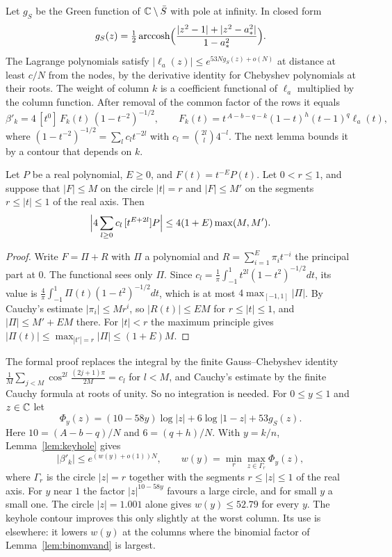 Let $g_S$ be the Green function of $\mathbb C\setminus\bar S$ with pole at infinity. In closed form
\[
 g_S(z)=\tfrac12\operatorname{arccosh}\Bigl(\frac{|z^2-1|+|z^2-a_*^2|}{1-a_*^2}\Bigr).
\]
The Lagrange polynomials satisfy $|\ell_a(z)|\le e^{53Ng_S(z)+o(N)}$ at distance at least $c/N$ from the
nodes, by the derivative identity for Chebyshev polynomials at their roots. The weight of column $k$ is a
coefficient functional of $\ell_a$ multiplied by the column function. After removal of the common factor of
the rows it equals
\[
 \beta'_k=4\,[t^0]\,F_k(t)\,(1-t^{-2})^{-1/2},\qquad F_k(t)=t^{\,A-b-q-k}(1-t)^h(t-1)^q\ell_a(t),
\]
where $(1-t^{-2})^{-1/2}=\sum_lc_lt^{-2l}$ with $c_l=\binom{2l}l4^{-l}$. The next lemma bounds it by a contour
that depends on $k$.

\begin{lemma}\label{lem:keyhole}
Let $P$ be a real polynomial, $E\ge0$, and $F(t)=t^{-E}P(t)$. Let $0<r\le1$, and suppose that $|F|\le M$ on
the circle $|t|=r$ and $|F|\le M'$ on the segments $r\le|t|\le1$ of the real axis. Then
\[
 \Bigl|4\sum_{l\ge0}c_l\,[t^{E+2l}]P\Bigr|\le4(1+E)\max(M,M').
\]
\end{lemma}

\begin{proof}
Write $F=\Pi+R$ with $\Pi$ a polynomial and $R=\sum_{i=1}^E\pi_it^{-i}$ the principal part at $0$. The
functional sees only $\Pi$. Since $c_l=\frac1\pi\int_{-1}^1t^{2l}(1-t^2)^{-1/2}dt$, its value is
$\frac4\pi\int_{-1}^1\Pi(t)(1-t^2)^{-1/2}dt$, which is at most $4\max_{[-1,1]}|\Pi|$. By Cauchy's estimate
$|\pi_i|\le Mr^i$, so $|R(t)|\le EM$ for $r\le|t|\le1$, and $|\Pi|\le M'+EM$ there. For $|t|<r$ the maximum
principle gives $|\Pi(t)|\le\max_{|t'|=r}|\Pi|\le(1+E)M$.
\end{proof}

The formal proof replaces the integral by the finite Gauss--Chebyshev identity
$\frac1M\sum_{j<M}\cos^{2l}\frac{(2j+1)\pi}{2M}=c_l$ for $l<M$, and Cauchy's estimate by the finite Cauchy formula
at roots of unity. So no integration is needed. For $0\le y\le1$ and $z\in\mathbb C$ let
\[
 \Phi_y(z)=(10-58y)\log|z|+6\log|1-z|+53g_S(z).
\]
Here $10=(A-b-q)/N$ and $6=(q+h)/N$. With $y=k/n$, Lemma~\ref{lem:keyhole} gives
\begin{equation}\label{eq:wk}
 |\beta'_k|\le e^{(w(y)+o(1))N},\qquad w(y)=\min_r\max_{z\in\Gamma_r}\Phi_y(z),
\end{equation}
where $\Gamma_r$ is the circle $|z|=r$ together with the segments $r\le|z|\le1$ of the real axis. For $y$ near
$1$ the factor $|z|^{10-58y}$ favours a large circle, and for small $y$ a small one. The circle $|z|=1.001$ alone
gives $w(y)\le52.79$ for every $y$. The keyhole contour improves this only slightly at the worst column. Its
use is elsewhere: it lowers $w(y)$ at the columns where the binomial factor of Lemma~\ref{lem:binomvand} is
largest.

